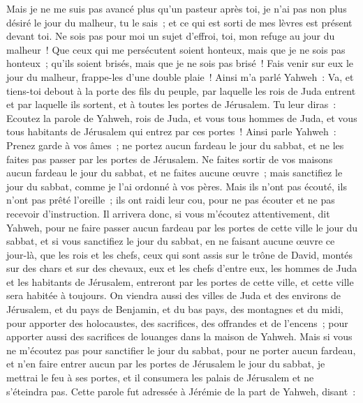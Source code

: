 \begin{multicols}{2}
Mais je ne me suis pas avancé plus qu'un pasteur après toi, je n'ai pas non plus désiré le jour du malheur, tu le sais~; et ce qui est sorti de mes lèvres est présent devant toi.
Ne sois pas pour moi un sujet d'effroi, toi, mon refuge au jour du malheur~!
Que ceux qui me persécutent soient honteux, mais que je ne sois pas honteux~; qu'ils soient brisés, mais que je ne sois pas brisé~! Fais venir sur eux le jour du malheur, frappe-les d'une double plaie~!
Ainsi m'a parlé Yahweh~: Va, et tiens-toi debout à la porte des fils du peuple, par laquelle les rois de Juda entrent et par laquelle ils sortent, et à toutes les portes de Jérusalem.
Tu leur diras~: Ecoutez la parole de Yahweh, rois de Juda, et vous tous hommes de Juda, et vous tous habitants de Jérusalem qui entrez par ces portes~!
Ainsi parle Yahweh~: Prenez garde à vos âmes~; ne portez aucun fardeau le jour du sabbat, et ne les faites pas passer par les portes de Jérusalem.
Ne faites sortir de vos maisons aucun fardeau le jour du sabbat, et ne faites aucune œuvre~; mais sanctifiez le jour du sabbat, comme je l'ai ordonné à vos pères.
Mais ils n'ont pas écouté, ils n'ont pas prêté l'oreille~; ils ont raidi leur cou, pour ne pas écouter et ne pas recevoir d'instruction.
Il arrivera donc, si vous m'écoutez attentivement, dit Yahweh, pour ne faire passer aucun fardeau par les portes de cette ville le jour du sabbat, et si vous sanctifiez le jour du sabbat, en ne faisant aucune œuvre ce jour-là,
que les rois et les chefs, ceux qui sont assis sur le trône de David, montés sur des chars et sur des chevaux, eux et les chefs d'entre eux, les hommes de Juda et les habitants de Jérusalem, entreront par les portes de cette ville, et cette ville sera habitée à toujours.
On viendra aussi des villes de Juda et des environs de Jérusalem, et du pays de Benjamin, et du bas pays, des montagnes et du midi, pour apporter des holocaustes, des sacrifices, des offrandes et de l'encens~; pour apporter aussi des sacrifices de louanges dans la maison de Yahweh.
Mais si vous ne m'écoutez pas pour sanctifier le jour du sabbat, pour ne porter aucun fardeau, et n'en faire entrer aucun par les portes de Jérusalem le jour du sabbat, je mettrai le feu à ses portes, et il consumera les palais de Jérusalem et ne s'éteindra pas.
\VerseOne{}Cette parole fut adressée à Jérémie de la part de Yahweh, disant~:

\end{multicols}

